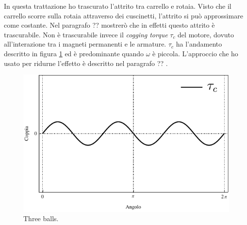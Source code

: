In questa trattazione ho trascurato l'attrito tra carrello e rotaia.
Visto che il carrello scorre sulla rotaia attraverso dei cuscinetti,
l'attrito si può approssimare come costante.
Nel paragrafo ??  mostrerò che in effetti questo attrito
è trascurabile.
Non è trascurabile invece il \emph{cogging torque} $\tau_c$ del motore,
dovuto all'interazione tra i magneti permanenti e le armature. $\tau_c$ ha
l'andamento descritto in figura \ref{fig:cogging} ed è predominante quando $\omega$ è
piccola.
L'approccio che ho usato per ridurne l'effetto è descritto nel paragrafo ?? .

\begin{figure}[hbp]
    \centering
    \includegraphics{assets/cogging-torque}
    \caption[Three balls]{Three balls.}
    \label{fig:cogging}
\end{figure}